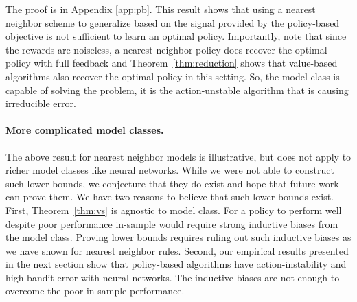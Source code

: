 
The proof is in Appendix \ref{app:pb}.
This result shows that using a nearest neighbor scheme to generalize based on the signal provided by the policy-based objective is not sufficient to learn an optimal policy.
Importantly, note that since the rewards are noiseless, a nearest neighbor policy does recover the optimal policy with full feedback and Theorem~\ref{thm:reduction} shows that value-based algorithms also recover the optimal policy in this setting. So, the model class is capable of solving the problem, it is the action-unstable algorithm that is causing irreducible error.


\paragraph{More complicated model classes.}
The above result for nearest neighbor models is illustrative, but does not apply to richer model classes like neural networks. While we were not able to construct such lower bounds, we conjecture that they do exist and hope that future work can prove them. We have two reasons to believe that such lower bounds exist. First, Theorem~\ref{thm:vs} is agnostic to model class. For a policy to perform well despite poor performance in-sample would require strong inductive biases from the model class. Proving lower bounds requires ruling out such inductive biases as we have shown for nearest neighbor rules. Second, our empirical results presented in the next section show that policy-based algorithms have action-instability and high bandit error with neural networks. The inductive biases are not enough to overcome the poor in-sample performance.



